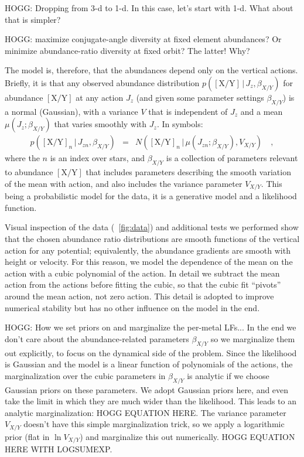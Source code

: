 \documentclass[modern]{aastex62}
\newcommand{\given}{\,|\,}
\newcommand{\abundance}[2]{\mathrm{\left[{#1}/{#2}\right]}}
\begin{document}
HOGG: Dropping from 3-d to 1-d. In this case, let's start with 1-d. What about that is simpler?

HOGG: maximize conjugate-angle diversity at fixed element abundances?
Or minimize abundance-ratio diversity at fixed orbit? The latter! Why?

The model is, therefore, that the abundances depend only on the vertical actions.
Briefly, it is that any observed abundance distribution
$p(\abundance{X}{Y}\given J_z,\beta_{X/Y})$ for abundance
$\abundance{X}{Y}$ at any action $J_z$ (and given some parameter settings $\beta_{X/Y}$)
is a normal (Gaussian), with a variance $V$ that
is independent of $J_z$ and a mean $\mu(J_z;\beta_{X/Y})$ that varies smoothly with $J_z$.
In symbols:
\begin{eqnarray}
p(\abundance{X}{Y}_n\given J_{zn},\beta_{X/Y}) &=& N(\abundance{X}{Y}_n\given \mu(J_{zn};\beta_{X/Y}), V_{X/Y})
\quad ,
\end{eqnarray}
where the $n$ is an index over stars, and $\beta_{X/Y}$ is a collection of parameters
relevant to abundance $\abundance{X}{Y}$
that includes
parameters describing the smooth variation of the mean with action, and also includes
the variance parameter $V_{X/Y}$.
This being a probabilistic model for the data, it is a generative model and a likelihood function.

Visual inspection of the data (\figurename~\ref{fig:data}) and additional tests we performed
show that the chosen abundance ratio distributions
are smooth functions of the vertical action for any potential;
equivalently, the abundance gradients are smooth with height or velocity.
For this reason, we model the dependence of the mean on the action with a cubic polynomial of
the action.
In detail we subtract the mean action from the actions before fitting the cubic, so that the
cubic fit ``pivots'' around the mean action, not zero action.
This detail is adopted to improve numerical stability but has no other influence on the model
in the end.

HOGG: How we set priors on and marginalize the per-metal LFs...
In the end we don't care about the abundance-related parameters $\beta_{X/Y}$ so we marginalize
them out explicitly, to focus on the dynamical side of the problem.
Since the likelihood is Gaussian and the model is a linear function of polynomials of the actions,
the marginalization over the cubic parameters in $\beta_{X/Y}$ is analytic if we choose
Gaussian priors on these parameters.
We adopt Gaussian priors here, and even take the limit in which they are much wider than
the likelihood.
This leads to an analytic marginalization:
HOGG EQUATION HERE.
The variance parameter $V_{X/Y}$ doesn't have this simple marginalization trick, so we apply a
logarithmic prior (flat in $\ln V_{X/Y}$) and marginalize this out numerically.
HOGG EQUATION HERE WITH LOGSUMEXP.
\end{document}
